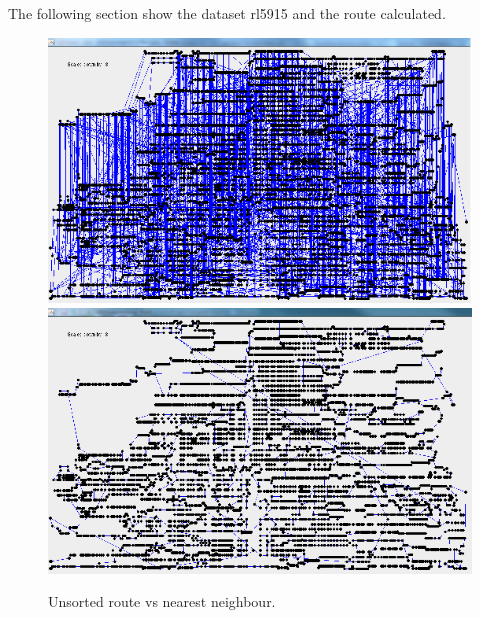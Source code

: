 \documentclass[conference,backref=page]{acmsiggraph}
\begin{document}
 The following section show the dataset rl5915 and the route calculated.
\onecolumn
\begin{figure}[h]
	\includegraphics[width=\columnwidth]{images/rl5915unsorted.png}
	\includegraphics[width=\columnwidth]{images/rl5915nn.png}
	\caption{Unsorted route vs nearest neighbour.}
\end{figure}
\end{document}
